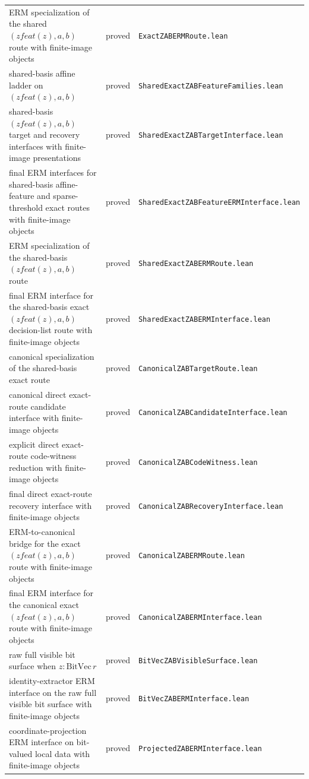 \documentclass[11pt]{article}
\theoremstyle{remark}
\begin{document}
\begin{center}
\begin{tabular}{lll}
ERM specialization of the shared $(zfeat(z),a,b)$ route with finite-image objects & proved & \texttt{ExactZABERMRoute.lean} \\
shared-basis affine ladder on $(zfeat(z),a,b)$ & proved & \texttt{SharedExactZABFeatureFamilies.lean} \\
shared-basis $(zfeat(z),a,b)$ target and recovery interfaces with finite-image presentations & proved & \texttt{SharedExactZABTargetInterface.lean} \\
final ERM interfaces for shared-basis affine-feature and sparse-threshold exact routes with finite-image objects & proved & \texttt{SharedExactZABFeatureERMInterface.lean} \\
ERM specialization of the shared-basis $(zfeat(z),a,b)$ route & proved & \texttt{SharedExactZABERMRoute.lean} \\
final ERM interface for the shared-basis exact $(zfeat(z),a,b)$ decision-list route with finite-image objects & proved & \texttt{SharedExactZABERMInterface.lean} \\
canonical specialization of the shared-basis exact route & proved & \texttt{CanonicalZABTargetRoute.lean} \\
canonical direct exact-route candidate interface with finite-image objects & proved & \texttt{CanonicalZABCandidateInterface.lean} \\
explicit direct exact-route code-witness reduction with finite-image objects & proved & \texttt{CanonicalZABCodeWitness.lean} \\
final direct exact-route recovery interface with finite-image objects & proved & \texttt{CanonicalZABRecoveryInterface.lean} \\
ERM-to-canonical bridge for the exact $(zfeat(z),a,b)$ route with finite-image objects & proved & \texttt{CanonicalZABERMRoute.lean} \\
final ERM interface for the canonical exact $(zfeat(z),a,b)$ route with finite-image objects & proved & \texttt{CanonicalZABERMInterface.lean} \\
raw full visible bit surface when $z : \mathrm{BitVec}\, r$ & proved & \texttt{BitVecZABVisibleSurface.lean} \\
identity-extractor ERM interface on the raw full visible bit surface with finite-image objects & proved & \texttt{BitVecZABERMInterface.lean} \\
coordinate-projection ERM interface on bit-valued local data with finite-image objects & proved & \texttt{ProjectedZABERMInterface.lean} \\

\end{tabular}
\end{center}
\end{document}
